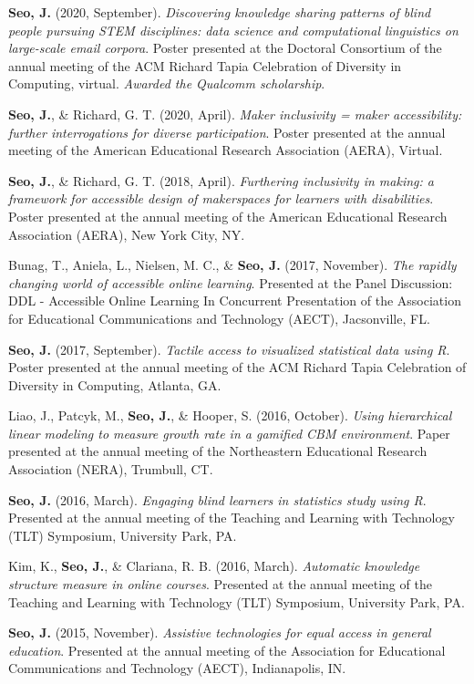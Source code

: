 \documentclass[11pt,a4paper,]{awesome-cv}
\begin{document}
\textbf{Seo, J.} (2020, September). \emph{Discovering knowledge sharing
patterns of blind people pursuing STEM disciplines: data science and
computational linguistics on large-scale email corpora}. Poster
presented at the Doctoral Consortium of the annual meeting of the ACM
Richard Tapia Celebration of Diversity in Computing, virtual.
\emph{Awarded the Qualcomm scholarship}.

\textbf{Seo, J.}, \& Richard, G. T. (2020, April). \emph{Maker
inclusivity = maker accessibility: further interrogations for diverse
participation}. Poster presented at the annual meeting of the American
Educational Research Association (AERA), Virtual.

\textbf{Seo, J.}, \& Richard, G. T. (2018, April). \emph{Furthering
inclusivity in making: a framework for accessible design of makerspaces
for learners with disabilities}. Poster presented at the annual meeting
of the American Educational Research Association (AERA), New York City,
NY.

Bunag, T., Aniela, L., Nielsen, M. C., \& \textbf{Seo, J.} (2017,
November). \emph{The rapidly changing world of accessible online
learning}. Presented at the Panel Discussion: DDL - Accessible Online
Learning In Concurrent Presentation of the Association for Educational
Communications and Technology (AECT), Jacsonville, FL.

\textbf{Seo, J.} (2017, September). \emph{Tactile access to visualized
statistical data using R}. Poster presented at the annual meeting of the
ACM Richard Tapia Celebration of Diversity in Computing, Atlanta, GA.

Liao, J., Patcyk, M., \textbf{Seo, J.}, \& Hooper, S. (2016, October).
\emph{Using hierarchical linear modeling to measure growth rate in a
gamified CBM environment}. Paper presented at the annual meeting of the
Northeastern Educational Research Association (NERA), Trumbull, CT.

\textbf{Seo, J.} (2016, March). \emph{Engaging blind learners in
statistics study using R}. Presented at the annual meeting of the
Teaching and Learning with Technology (TLT) Symposium, University Park,
PA.

Kim, K., \textbf{Seo, J.}, \& Clariana, R. B. (2016, March).
\emph{Automatic knowledge structure measure in online courses}.
Presented at the annual meeting of the Teaching and Learning with
Technology (TLT) Symposium, University Park, PA.

\textbf{Seo, J.} (2015, November). \emph{Assistive technologies for
equal access in general education}. Presented at the annual meeting of
the Association for Educational Communications and Technology (AECT),
Indianapolis, IN.
\end{document}
